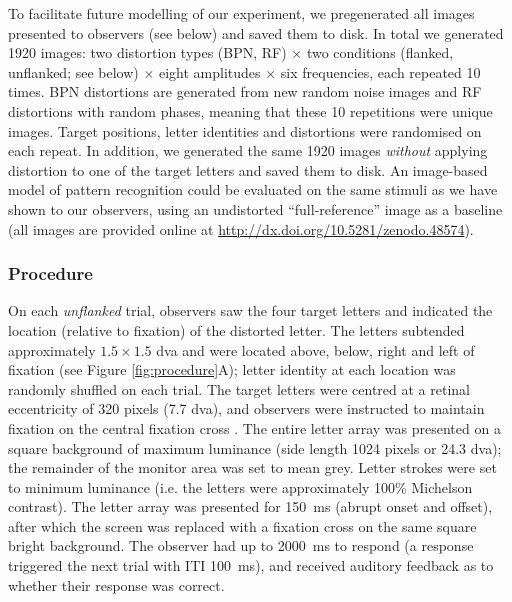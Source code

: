 \documentclass[doc, 11pt,a4paper,natbib]{apa6}\usepackage[]{graphicx}\usepackage[]{color}
\begin{document}
To facilitate future modelling of our experiment, we pregenerated all images presented to observers (see below) and saved them to disk.
In total we generated 1920 images: two distortion types (BPN, RF) $\times$ two conditions (flanked, unflanked; see below) $\times$ eight amplitudes $\times$ six frequencies, each repeated 10 times.
BPN distortions are generated from new random noise images and RF distortions with random phases, meaning that these 10 repetitions were unique images.
Target positions, letter identities and distortions were randomised on each repeat.
In addition, we generated the same 1920 images \textit{without} applying distortion to one of the target letters and saved them to disk.
An image-based model of pattern recognition could be evaluated on the same stimuli as we have shown to our observers, using an undistorted ``full-reference'' image as a baseline (all images are provided online at \url{http://dx.doi.org/10.5281/zenodo.48574}).

\subsubsection{Procedure}

On each \textit{unflanked} trial, observers saw the four target letters and indicated the location (relative to fixation) of the distorted letter.
The letters subtended approximately $1.5 \times 1.5$ dva and were located above, below, right and left of fixation (see Figure \ref{fig:procedure}A); letter identity at each location was randomly shuffled on each trial.
The target letters were centred at a retinal eccentricity of 320 pixels (7.7 dva), and observers were instructed to maintain fixation on the central fixation cross \citep[best for steady fixation from][]{thaler_what_2013}.
The entire letter array was presented on a square background of maximum luminance (side length 1024 pixels or 24.3 dva); the remainder of the monitor area was set to mean grey.
Letter strokes were set to minimum luminance (i.e. the letters were approximately 100\% Michelson contrast).
The letter array was presented for 150~ms (abrupt onset and offset), after which the screen was replaced with a fixation cross on the same square bright background.
The observer had up to 2000~ms to respond (a response triggered the next trial with ITI 100~ms), and received auditory feedback as to whether their response was correct.
\end{document}
